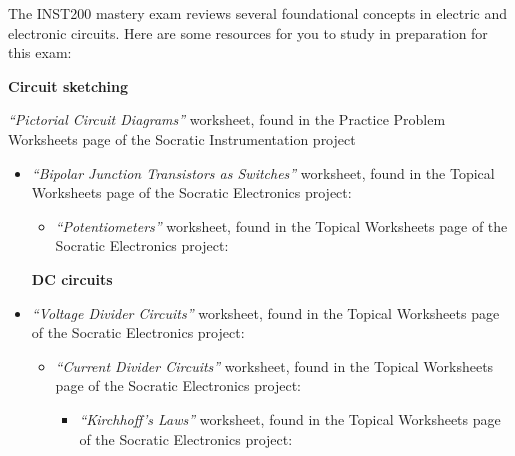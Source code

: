 

The INST200 mastery exam reviews several foundational concepts in electric and electronic circuits.  Here are some resources for you to study in preparation for this exam:


\vskip 20pt

\noindent
{\bf Circuit sketching}

\item{} {\it ``Pictorial Circuit Diagrams''} worksheet, found in the Practice Problem Worksheets page of the Socratic Instrumentation project
\begin{itemize}

\vskip 5pt
\item{} {\it ``Bipolar Junction Transistors as Switches''} worksheet, found in the Topical Worksheets page of the Socratic Electronics project:
\begin{itemize}

\vskip 5pt
\item{} {\it ``Potentiometers''} worksheet, found in the Topical Worksheets page of the Socratic Electronics project:
\begin{itemize}

\end{itemize}
\end{itemize}



\vskip 20pt

\noindent
{\bf DC circuits}

\item{} {\it ``Voltage Divider Circuits''} worksheet, found in the Topical Worksheets page of the Socratic Electronics project:
\begin{itemize}

\vskip 5pt
\item{} {\it ``Current Divider Circuits''} worksheet, found in the Topical Worksheets page of the Socratic Electronics project:
\begin{itemize}

\vskip 5pt
\item{} {\it ``Kirchhoff's Laws''} worksheet, found in the Topical Worksheets page of the Socratic Electronics project:
\begin{itemize}


\end{itemize}
\end{itemize}
\end{itemize}
\end{itemize}
